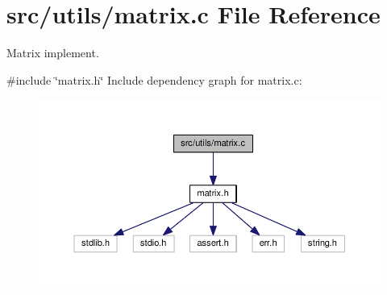 \section{src/utils/matrix.c File Reference}
\label{matrix_8c}


Matrix implement.  


{\ttfamily \#include \char`\"{}matrix.\+h\char`\"{}}\newline
Include dependency graph for matrix.\+c\+:\nopagebreak
\begin{figure}[H]
\begin{center}
\leavevmode
\includegraphics[width=350pt]{matrix_8c__incl}
\end{center}
\end{figure}
